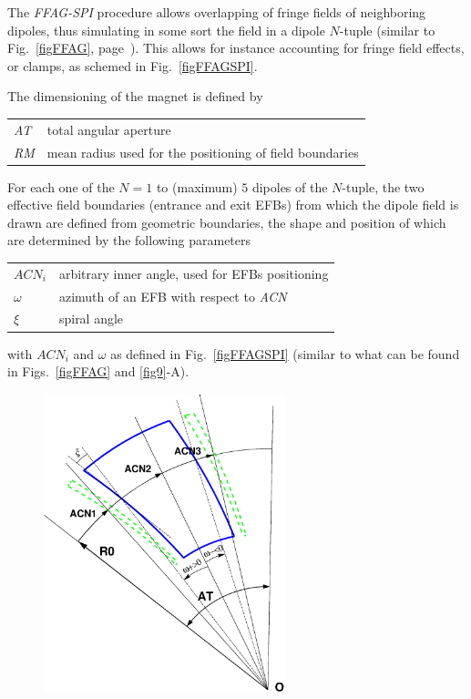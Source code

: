{\medskip

\noindent The \textsl{FFAG-SPI} procedure allows overlapping of fringe fields of neighboring dipoles, 
thus simulating in some sort the field in a dipole $N$-tuple  (similar to Fig.~\ref{figFFAG}, page~\pageref{figFFAG}).
This allows  for instance accounting for fringe field effects, or clamps, as schemed in 
Fig.~\ref{figFFAGSPI}. 

\medskip

\noindent  The dimensioning of the magnet is defined by

\medskip

 \begin{tabular}{>{\sl}l!{~:}l}
	 AT &  total angular aperture \\
	 RM & mean radius used for the positioning of field boundaries\\
 \end{tabular}

\medskip

\noindent For each one of the $N=1$ to (maximum) $5$ dipoles of the  $N$-tuple, 
the two  effective field boundaries (entrance and exit EFBs) from which  the dipole field  is drawn are
defined from geometric boundaries, the shape and position of which are determined by the 
following parameters 

\medskip

\begin{tabular}{l!{~:}l}
	$ACN_i$  & arbitrary inner angle, used for EFBs positioning  \\
	$\omega$ &  azimuth of an EFB with respect to  \textsl{ACN}\\
	$\xi$ & spiral angle \\
\end{tabular}

\medskip

\noindent with $ACN_i$ and $\omega$ as defined in Fig.~\ref{figFFAGSPI} 
(similar to what can be found in Figs.~\ref{figFFAG} and \ref{fig9}-A). 

\begin{figure}[h]
\centerline{\includegraphics[width=7cm]{figFFAGSPI.eps}  }
{\setlength{\captionwidth}{12cm}
 }
\end{figure}


}
